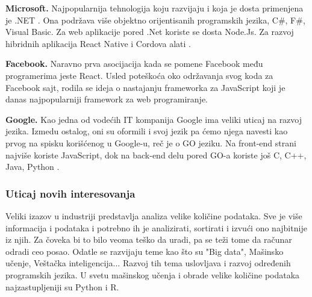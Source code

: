 \documentclass[a4paper]{article}
\begin{document}
\textbf{Microsoft.} Najpopularnija tehnologija koju razvijaju i koja je dosta primenjena je .NET \cite{dotnet}. Ona podržava više objektno orijentisanih programskih jezika, C\#, F\#, Visual Basic. Za web aplikacije pored .Net koriste se dosta Node.Js. Za razvoj hibridnih aplikacija React Native i Cordova alati \cite{webPlatforms}.

\textbf{Facebook.} Naravno prva asocijacija kada se pomene Facebook među programerima jeste React. Usled poteškoća oko održavanja svog koda za Facebook sajt, rodila se ideja o nastajanju frameworka za JavaScript koji je danas najpopularniji framework za web programiranje.

\textbf{Google.} Kao jedna od vodećih IT kompanija Google ima veliki uticaj na razvoj jezika. Izmedu ostalog, oni su oformili i svoj jezik pa ćemo njega navesti kao prvog na spisku korišćenog u Google-u, reč je o GO jeziku. Na front-end strani najviše koriste JavaScript, dok na back-end delu pored GO-a koriste još C, C++, Java, Python \cite{google}.

\subsubsection{Uticaj novih interesovanja}
\label{subsec:Uticaj novih interesovanja}
Veliki izazov u industriji predstavlja analiza velike količine podataka. Sve je više informacija i podataka i potrebno ih je analizirati, sortirati i izvući ono najbitnije iz njih. Za čoveka bi to bilo veoma teško da uradi, pa se teži tome da računar odradi ceo posao. Odatle se razvijaju teme kao što su "Big data", Mašinsko učenje, Veštačka inteligencija... Razvoj tih tema uslovljava i razvoj određenih programskih jezika. U svetu mašinskog učenja i obrade velike količine podataka najzastupljeniji su Python i R.
\end{document}
